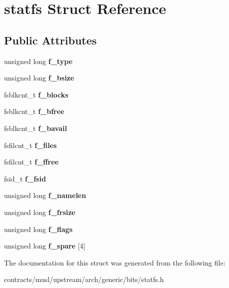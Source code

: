 \hypertarget{structstatfs}{}\section{statfs Struct Reference}
\label{structstatfs}
\subsection*{Public Attributes}
\begin{DoxyCompactItemize}
\item 
\mbox{\label{structstatfs_a44f334caa93ea8c9a08d12b97d604f2b}} 
unsigned long {\bfseries f\+\_\+type}
\item 
\mbox{\label{structstatfs_a2af610b7e3aceb5152e3f0325a510d3e}} 
unsigned long {\bfseries f\+\_\+bsize}
\item 
\mbox{\label{structstatfs_a8ff1ba6a241f98991bbcf15b664fecdb}} 
fsblkcnt\+\_\+t {\bfseries f\+\_\+blocks}
\item 
\mbox{\label{structstatfs_a73317208fd88aba938bb9d56c2ab49b0}} 
fsblkcnt\+\_\+t {\bfseries f\+\_\+bfree}
\item 
\mbox{\label{structstatfs_a840ad0a8ddfdf7873052d431cc85d42a}} 
fsblkcnt\+\_\+t {\bfseries f\+\_\+bavail}
\item 
\mbox{\label{structstatfs_accb6ca581db4e0f6290f129cc4e4989a}} 
fsfilcnt\+\_\+t {\bfseries f\+\_\+files}
\item 
\mbox{\label{structstatfs_a1a9dafe059c712f5c88f32fbd853c2da}} 
fsfilcnt\+\_\+t {\bfseries f\+\_\+ffree}
\item 
\mbox{\label{structstatfs_afcf81e6feb4f13016452fc6053aa289e}} 
fsid\+\_\+t {\bfseries f\+\_\+fsid}
\item 
\mbox{\label{structstatfs_a00b9e5dc16b5a96234239dc2c7d22ed5}} 
unsigned long {\bfseries f\+\_\+namelen}
\item 
\mbox{\label{structstatfs_aa3708b159c9cd872277866177762b21a}} 
unsigned long {\bfseries f\+\_\+frsize}
\item 
\mbox{\label{structstatfs_a625799f41f14656787f780072c1f7686}} 
unsigned long {\bfseries f\+\_\+flags}
\item 
\mbox{\label{structstatfs_a8e69f76bcfb912ee07f4ac33067b76ff}} 
unsigned long {\bfseries f\+\_\+spare} \mbox{[}4\mbox{]}
\end{DoxyCompactItemize}


The documentation for this struct was generated from the following file\+:\begin{DoxyCompactItemize}
\item 
contracts/musl/upstream/arch/generic/bits/statfs.\+h\end{DoxyCompactItemize}

